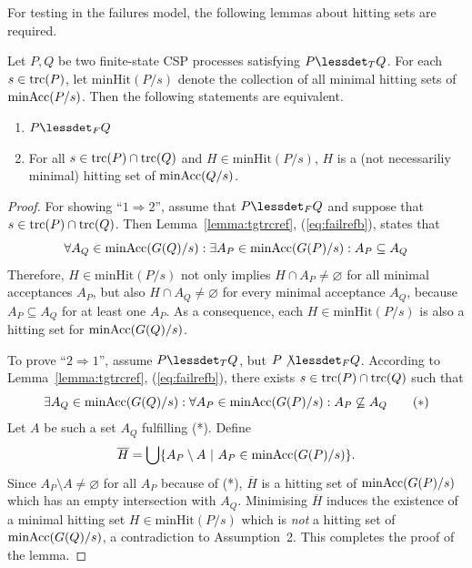 For testing in the failures model, the following lemmas about hitting sets are required.

\begin{lemma}
\label{lemma:hseta}
Let $P, Q$ be two finite-state CSP processes satisfying $P\lessdet_T Q$. 
For each $s\in\text{trc}(P)$,
let $\text{minHit}(P/s)$ denote the
collection of all minimal hitting sets of $\text{minAcc}(P/s)$. 
Then the following statements are equivalent.
\begin{enumerate}
\item $P\lessdet_F Q$
\item For all $s\in\text{trc}(P)\cap \text{trc}(Q)$ and $H \in  \text{minHit}(P/s)$, $H$ is
a (not necessariliy minimal) hitting set of $\text{minAcc}(Q/s)$.
\end{enumerate}
\end{lemma}
\begin{proof}
For showing ``$1 \Rightarrow 2$'', assume that $P\lessdet_F Q$ and suppose that
$s\in\text{trc}(P)\cap \text{trc}(Q)$. Then Lemma~\ref{lemma:tgtrcref}, (\ref{eq:failrefb}), 
states that 
\[
\forall A_Q\in\text{minAcc}(G(Q)/s):
\exists A_P\in\text{minAcc}(G(P)/s): A_P\subseteq A_Q
\]
Therefore,
$H \in  \text{minHit}(P/s)$ not only implies $H\cap A_P\neq\varnothing$ for all minimal
acceptances $A_P$, but also
$H\cap A_Q\neq\varnothing$ for every minimal acceptance $A_Q$, because $A_P\subseteq A_Q$ for at least one $A_P$. As a consequence, each $H \in  \text{minHit}(P/s)$ is also a hitting set for $\text{minAcc}(G(Q)/s)$.
 
To prove ``$2 \Rightarrow 1$'',
assume $P\lessdet_T Q$, but $P\not\lessdet_F Q$. According to Lemma~\ref{lemma:tgtrcref}, (\ref{eq:failrefb}), there exists $s\in\text{trc}(P)\cap \text{trc}(Q)$ such that 
\[
\exists A_Q\in\text{minAcc}(G(Q)/s): \forall A_P\in\text{minAcc}(G(P)/s): A_P\not\subseteq A_Q 
\qquad (*)
\]
Let $A$ be such a set $A_Q$ fulfilling (*).
Define 
\[
\overline H = \bigcup\{ A_P \setminus A~|~A_P\in\text{minAcc}(G(P)/s) \}.
\]
Since $A_P \setminus A \neq\varnothing$ for all $A_P$ because of (*), $\overline H$ is a hitting set
of $\text{minAcc}(G(P)/s)$ which has an  empty intersection with $A_Q$. Minimising 
$\overline H$ induces the existence
of a minimal hitting set $H\in \text{minHit}(P/s)$ which is {\it not} a hitting set  
of $\text{minAcc}(G(Q)/s)$, a contradiction to Assumption~2. This completes the proof of the lemma.
\xbox
\end{proof}

%
%







 
